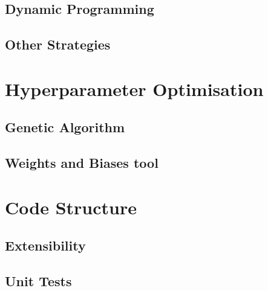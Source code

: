 \subsection{Dynamic Programming}


\subsection{Other Strategies}


\section{Hyperparameter Optimisation}


\subsection{Genetic Algorithm}


\subsection{Weights and Biases tool}


\section{Code Structure}


\subsection{Extensibility}

\subsection{Unit Tests}

